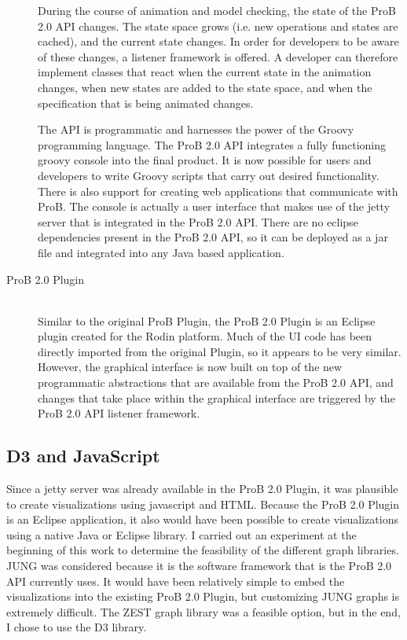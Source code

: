 \begin{description}
	During the course of animation and model checking, the state of the ProB 2.0 API changes. The state space grows (i.e. new operations and states are cached), and the current state changes. In order for developers to be aware of these changes, a listener framework is offered. A developer can therefore implement classes that react when the current state in the animation changes, when new states are added to the state space, and when the specification that is being animated changes.

	The API is programmatic and harnesses the power of the Groovy programming language. The ProB 2.0 API integrates a fully functioning groovy console into the final product. It is now possible for users and developers to write Groovy scripts that carry out desired functionality. There is also support for creating web applications that communicate with ProB. The console is actually a user interface that makes use of the jetty server that is integrated in the ProB 2.0 API. There are no eclipse dependencies present in the ProB 2.0 API, so it can be deployed as a jar file and integrated into any Java based application.

	\item[ProB 2.0 Plugin] \hfill \\
	Similar to the original ProB Plugin, the ProB 2.0 Plugin is an Eclipse plugin created for the Rodin platform. Much of the UI code has been directly imported from the original Plugin, so it appears to be very similar. However, the graphical interface is now built on top of the new programmatic abstractions that are available from the ProB 2.0 API, and changes that take place within the graphical interface are triggered by the ProB 2.0 API listener framework.

\end{description}

\subsection{D3 and JavaScript}

Since a jetty server was already available in the ProB 2.0 Plugin, it was plausible to create visualizations using javascript and HTML. Because the ProB 2.0 Plugin is an Eclipse application, it also would have been possible to create visualizations using a native Java or Eclipse library. I carried out an experiment at the beginning of this work to determine the feasibility of the different graph libraries. JUNG was considered because it is the software framework that is the ProB 2.0 API currently uses. It would have been relatively simple to embed the visualizations into the existing ProB 2.0 Plugin, but customizing JUNG graphs is extremely difficult. The ZEST graph library was a feasible option, but in the end, I chose to use the D3 library. 

